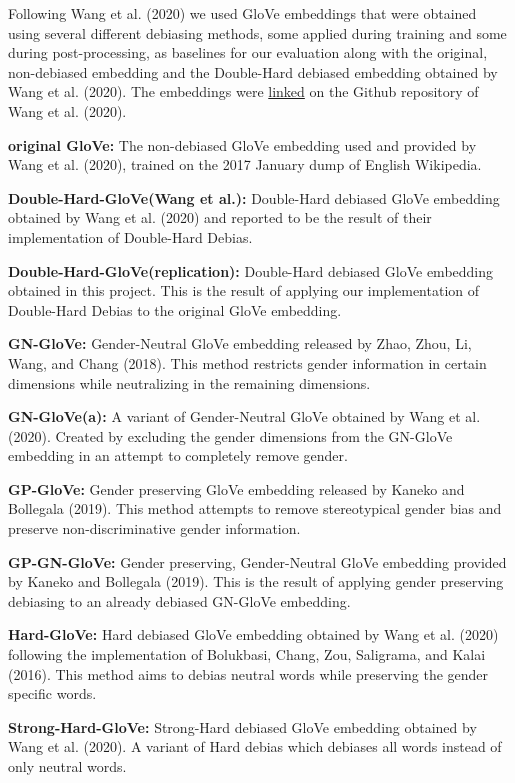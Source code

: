 \documentclass[
  english,
  man,floatsintext]{apa6}
\begin{document}
Following Wang et al. (2020) we used GloVe embeddings that were obtained using several different debiasing methods, some applied during training and some during post-processing, as baselines for our evaluation along with the original, non-debiased embedding and the Double-Hard debiased embedding obtained by Wang et al. (2020). The embeddings were \href{http://www.cs.virginia.edu/~tw8cb/word_embeddings/}{linked} on the Github repository of Wang et al. (2020).

\textbf{original GloVe:} The non-debiased GloVe embedding used and provided by Wang et al. (2020), trained on the 2017 January dump of English Wikipedia.

\textbf{Double-Hard-GloVe(Wang et al.):} Double-Hard debiased GloVe embedding obtained by Wang et al. (2020) and reported to be the result of their implementation of Double-Hard Debias.

\textbf{Double-Hard-GloVe(replication):} Double-Hard debiased GloVe embedding obtained in this project. This is the result of applying our implementation of Double-Hard Debias to the original GloVe embedding.

\textbf{GN-GloVe:} Gender-Neutral GloVe embedding released by Zhao, Zhou, Li, Wang, and Chang (2018). This method restricts gender information in certain dimensions while neutralizing in the remaining dimensions.

\textbf{GN-GloVe(a):} A variant of Gender-Neutral GloVe obtained by Wang et al. (2020). Created by excluding the gender dimensions from the GN-GloVe embedding in an attempt to completely remove gender.

\textbf{GP-GloVe:} Gender preserving GloVe embedding released by Kaneko and Bollegala (2019). This method attempts to remove stereotypical gender bias and preserve non-discriminative gender information.

\textbf{GP-GN-GloVe:} Gender preserving, Gender-Neutral GloVe embedding provided by Kaneko and Bollegala (2019). This is the result of applying gender preserving debiasing to an already debiased GN-GloVe embedding.

\textbf{Hard-GloVe:} Hard debiased GloVe embedding obtained by Wang et al. (2020) following the implementation of Bolukbasi, Chang, Zou, Saligrama, and Kalai (2016). This method aims to debias neutral words while preserving the gender specific words.

\textbf{Strong-Hard-GloVe:} Strong-Hard debiased GloVe embedding obtained by Wang et al. (2020). A variant of Hard debias which debiases all words instead of only neutral words.
\end{document}
